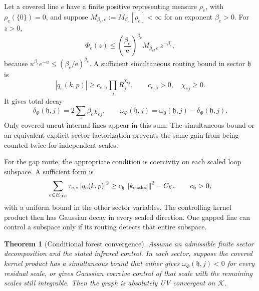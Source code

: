 \documentclass[final,5p,times,twocolumn,numbers,nopreprintline]{elsarticle}
\numberwithin{equation}{section}
\newtheorem{theorem}{Theorem}[section]
\theoremstyle{definition}
\theoremstyle{remark}
\newcommand{\Ph}{\Phi}
\newcommand{\norm}[1]{\left\lVert #1\right\rVert}
\newcommand{\abs}[1]{\left\lvert #1\right\rvert}
\begin{document}
Let a covered line \(e\) have a finite positive representing
measure \(\rho_e\), with \(\rho_e(\{0\})=0\), and suppose
\(M_{\beta_e,e}:=M_{\beta_e}[\rho_e]<\infty\) for an exponent
\(\beta_e>0\).
For \(z>0\),
\begin{equation}
 \Ph_e(z)\leq
 \left(\frac{\beta_e}{\mathrm e}\right)^{\beta_e}
 M_{\beta_e,e}\,z^{-\beta_e},
 \label{eq:moment-power-bound}
\end{equation}
because \(u^{\beta_e}e^{-u}\leq
(\beta_e/\mathrm e)^{\beta_e}\).
A sufficient simultaneous routing bound in sector \(\mathfrak h\)
is
\begin{equation}
 \abs{q_e(k,p)}\geq c_{e,\mathfrak h}
       \prod_jR_j^{\chi_{ej}},\qquad
 c_{e,\mathfrak h}>0,\quad \chi_{ej}\geq0.
 \label{eq:simultaneous-routing}
\end{equation}
It gives total decay
\begin{equation}
 \delta_\Ph(\mathfrak h,j)=2\sum_e\beta_e\chi_{ej},
 \qquad
 \omega_\Ph(\mathfrak h,j)=
       \omega_0(\mathfrak h,j)-\delta_\Ph(\mathfrak h,j).
 \label{eq:forest-degree}
\end{equation}
Only covered uncut internal lines appear in this sum. The simultaneous
bound or an equivalent explicit sector factorization prevents the
same gain from being counted twice for independent scales.

For the gap route, the appropriate condition is coercivity on each
scaled loop subspace. A sufficient form is
\begin{equation}
 \sum_{e\in E_{\rm ctrl}}\tau_{e,*}\abs{q_e(k,p)}^2
   \geq c_{\mathfrak h}\norm{k_{\rm scaled}}^2-C_{\mathcal K},
 \qquad c_{\mathfrak h}>0,
 \label{eq:gap-coercivity}
\end{equation}
with a uniform bound in the other sector variables.
The controlling kernel product then has Gaussian decay in every
scaled direction. One gapped line can control a subspace only if its
routing detects that entire subspace.

\begin{theorem}[Conditional forest convergence]
\label{thm:forest}
Assume an admissible finite sector decomposition and the stated
infrared control. In each sector, suppose the covered kernel product
has a simultaneous bound that either gives
\(\omega_\Ph(\mathfrak h,j)<0\) for every residual scale,
or gives Gaussian coercive control of that scale with the remaining
scales still integrable. Then the graph is absolutely UV convergent
on \(\mathcal K\).
\end{theorem}
\end{document}
